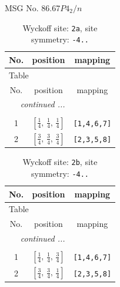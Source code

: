 \documentclass[fleqn,8pt]{jsarticle}
\begin{document}
\setcounter{MaxMatrixCols}{32}

\renewcommand{\tablename}{Table~}
\renewcommand{\figurename}{Figure~}
\begin{center}
\LARGE
MSG No. 86.67\quad$P4_{2}/n$
\end{center}
\renewcommand{\arraystretch}{1.2}
\begin{longtable}{ccc}
\caption{Wyckoff site: {\tt 2a}, site symmetry: {\tt -4..}}
 \\
 \hline \hline
No. & position & mapping \\ \hline \endfirsthead

\multicolumn{2}{l}{\tablename\ \thetable{}} \\
 \hline \hline
No. & position & mapping \\ \hline \endhead

 \hline \hline
\multicolumn{2}{r}{\footnotesize\it continued ...} \\ \endfoot

 \hline \hline
\multicolumn{2}{r}{} \\ \endlastfoot

1 & $\left[ \frac{1}{4},\, \frac{1}{4},\, \frac{1}{4} \right]$ & {\tt [1,4,6,7]} \\ \hline
2 & $\left[ \frac{3}{4},\, \frac{3}{4},\, \frac{3}{4} \right]$ & {\tt [2,3,5,8]} \\
\end{longtable}
\renewcommand{\arraystretch}{1.2}
\begin{longtable}{ccc}
\caption{Wyckoff site: {\tt 2b}, site symmetry: {\tt -4..}}
 \\
 \hline \hline
No. & position & mapping \\ \hline \endfirsthead

\multicolumn{2}{l}{\tablename\ \thetable{}} \\
 \hline \hline
No. & position & mapping \\ \hline \endhead

 \hline \hline
\multicolumn{2}{r}{\footnotesize\it continued ...} \\ \endfoot

 \hline \hline
\multicolumn{2}{r}{} \\ \endlastfoot

1 & $\left[ \frac{1}{4},\, \frac{1}{4},\, \frac{3}{4} \right]$ & {\tt [1,4,6,7]} \\ \hline
2 & $\left[ \frac{3}{4},\, \frac{3}{4},\, \frac{1}{4} \right]$ & {\tt [2,3,5,8]} \\
\end{longtable}
\end{document}
